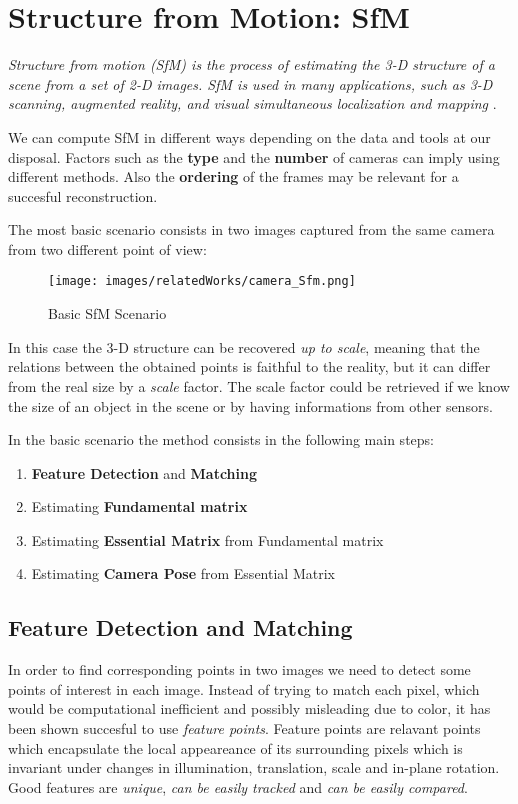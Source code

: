 \section{Structure from Motion: SfM}
\textit{Structure from motion (SfM) is the process of estimating the 3-D
structure of a scene from a set of 2-D images. SfM is used in many
applications, such as 3-D scanning, augmented reality, and visual
simultaneous localization and mapping} \cite{sfm_matlab}.

We can compute SfM in different ways depending on the data and tools at our disposal.
Factors such as the \textbf{type} and the \textbf{number} of cameras can imply using different methods. Also 
the \textbf{ordering} of the frames may be relevant for a succesful reconstruction.

The most basic scenario consists in two images captured from the same camera from two different point of view:
\begin{figure}[H]
    \centering
    \texttt{[image: images/relatedWorks/camera\_Sfm.png]} %
    \caption{Basic SfM Scenario}
    \label{fig:sfm_basic}
\end{figure}
 In this case the 3-D structure can be recovered \textit{up to scale}, meaning that the relations between the obtained
 points is faithful to the reality, but it can differ from the real size by a \textit{scale} factor. The scale factor
 could be retrieved if we know the size of an object in the scene or by having informations from other sensors.

 In the basic scenario the method consists in the following main steps:
 \begin{enumerate}
    \item \textbf{Feature Detection} and \textbf{Matching}
    \item Estimating \textbf{Fundamental matrix}
    \item Estimating \textbf{Essential Matrix} from Fundamental matrix
    \item Estimating \textbf{Camera Pose} from Essential Matrix
 \end{enumerate}

 \subsection{Feature Detection and Matching }
 In order to find corresponding points in two images we need to detect some points of interest in each image.
 Instead of trying to match each pixel, which would be computational inefficient and possibly misleading due to color,
 it has been shown succesful to use \textit{feature points}. Feature points are relavant points which encapsulate the local
 appeareance of its surrounding pixels which is invariant under changes in illumination, translation, scale and in-plane rotation.
 Good features are \textit{unique}, \textit{can be easily tracked} and \textit{can be easily compared}.

